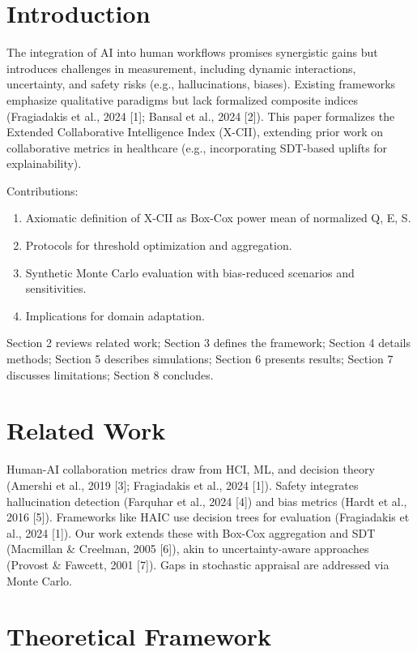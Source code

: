 \documentclass[a4paper]{article}
\begin{document}
\section{Introduction}

The integration of AI into human workflows promises synergistic gains but introduces challenges in measurement, including dynamic interactions, uncertainty, and safety risks (e.g., hallucinations, biases). Existing frameworks emphasize qualitative paradigms but lack formalized composite indices (Fragiadakis et al., 2024 [1]; Bansal et al., 2024 [2]). This paper formalizes the Extended Collaborative Intelligence Index (X-CII), extending prior work on collaborative metrics in healthcare (e.g., incorporating SDT-based uplifts for explainability).

Contributions:
\begin{enumerate}
    \item Axiomatic definition of X-CII as Box-Cox power mean of normalized Q, E, S.
    \item Protocols for threshold optimization and aggregation.
    \item Synthetic Monte Carlo evaluation with bias-reduced scenarios and sensitivities.
    \item Implications for domain adaptation.
\end{enumerate}

Section 2 reviews related work; Section 3 defines the framework; Section 4 details methods; Section 5 describes simulations; Section 6 presents results; Section 7 discusses limitations; Section 8 concludes.

\section{Related Work}

Human-AI collaboration metrics draw from HCI, ML, and decision theory (Amershi et al., 2019 [3]; Fragiadakis et al., 2024 [1]). Safety integrates hallucination detection (Farquhar et al., 2024 [4]) and bias metrics (Hardt et al., 2016 [5]). Frameworks like HAIC use decision trees for evaluation (Fragiadakis et al., 2024 [1]). Our work extends these with Box-Cox aggregation and SDT (Macmillan \& Creelman, 2005 [6]), akin to uncertainty-aware approaches (Provost \& Fawcett, 2001 [7]). Gaps in stochastic appraisal are addressed via Monte Carlo.

\section{Theoretical Framework}
\end{document}
